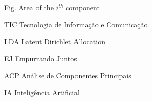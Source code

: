 \begin{siglas}
  \item[Fig.] Area of the $i^{th}$ component
  \item[TIC] Tecnologia de Informação e Comunicação
  \item[LDA] Latent Dirichlet Allocation
  \item[EJ] Empurrando Juntos
  \item[ACP] Análise de Componentes Principais
  \item[IA] Inteligência Artificial
\end{siglas}
